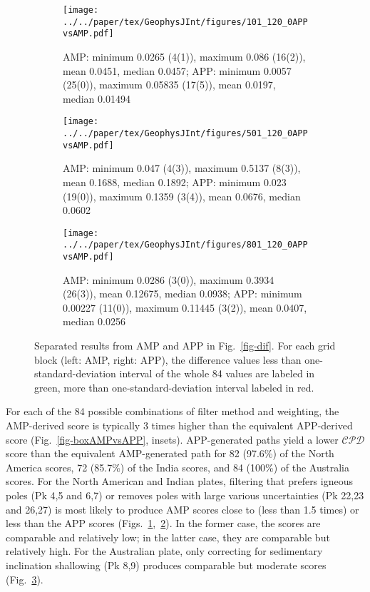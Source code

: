 \begin{figure*}
	\centering
	\begin{subfigure}{1.01\textwidth}
		\texttt{[image: ../../paper/tex/GeophysJInt/figures/101\_120\_0APPvsAMP.pdf]}
		\caption{AMP\@: minimum 0.0265 (4(1)), maximum 0.086 (16(2)), mean
		0.0451, median 0.0457; APP\@: minimum 0.0057 (25(0)), maximum
		0.05835 (17(5)), mean 0.0197, median 0.01494}\label{fig-na-difAMPvsAPP}
	\end{subfigure}
	\vspace{.1em}
	\begin{subfigure}{1.01\textwidth}
		\texttt{[image: ../../paper/tex/GeophysJInt/figures/501\_120\_0APPvsAMP.pdf]}
		\caption{AMP\@: minimum 0.047 (4(3)), maximum 0.5137 (8(3)), mean
		0.1688, median 0.1892; APP\@: minimum 0.023 (19(0)), maximum 0.1359
		(3(4)), mean 0.0676, median 0.0602}\label{fig-in-difAMPvsAPP}
	\end{subfigure}
	\vspace{.1em}
	\begin{subfigure}{1.01\textwidth}
		\texttt{[image: ../../paper/tex/GeophysJInt/figures/801\_120\_0APPvsAMP.pdf]}
		\caption{AMP\@: minimum 0.0286 (3(0)), maximum 0.3934 (26(3)), mean
		0.12675, median 0.0938; APP\@: minimum 0.00227 (11(0)), maximum 0.11445
		(3(2)), mean 0.0407, median 0.0256}\label{fig-au-difAMPvsAPP}
	\end{subfigure}
	\caption[$\mathcal{CPD}$ of each plate's paleomagnetic APWPs vs its FHM
predicted APWP (AMP vs APP)]{Separated results from AMP and APP in
Fig.~\ref{fig-dif}. For each grid block (left: AMP, right: APP), the difference
values less than one-standard-deviation interval of the whole 84 values are
labeled in green, more than one-standard-deviation interval labeled in
red.}\label{fig-difAMPvsAPP}
\end{figure*}

For each of the 84 possible combinations of filter method and weighting, the
AMP-derived score is typically 3 times higher than the equivalent
APP-derived score (Fig.~\ref{fig-boxAMPvsAPP}, insets). APP-generated paths
yield a lower $\mathcal{CPD}$ score than the equivalent AMP-generated path for
82 (97.6\%) of the North America scores, 72 (85.7\%) of the India scores, and 84
(100\%) of the Australia scores. For the North American and Indian plates,
filtering that prefers igneous poles (Pk 4,5 and 6,7) or removes
poles with large various uncertainties (Pk 22,23 and 26,27) is most likely
to produce AMP scores close to (less than 1.5 times) or less than the APP scores
(Figs.~\ref{fig-na-difAMPvsAPP},~\ref{fig-in-difAMPvsAPP}). In the former case,
the scores are comparable and relatively low; in the latter case, they are
comparable but relatively high. For the Australian plate, only correcting for
sedimentary inclination shallowing (Pk 8,9) produces comparable but moderate
scores (Fig.~\ref{fig-au-difAMPvsAPP}).


